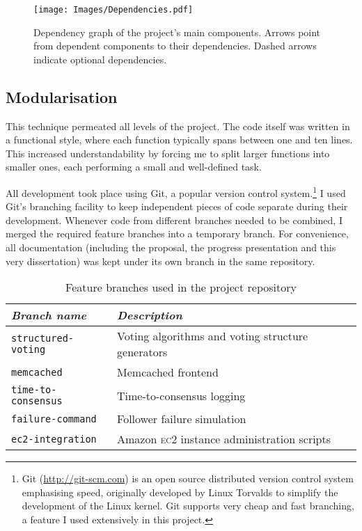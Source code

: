 \documentclass[12pt,chapterprefix=true,toc=bibliography,numbers=noendperiod,
               footnotes=multiple,twoside]{scrreprt}
\newcommand{\ECC}[0]{\textsc{ec}2 }
\begin{document}
\begin{figure}[h]
    \centering
    \texttt{[image: Images/Dependencies.pdf]}
    \caption{Dependency graph of the project's main components. Arrows point from dependent components to their dependencies. Dashed arrows indicate optional dependencies.}
    \label{fig:dependencies}
\end{figure}

\subsection{Modularisation}

This technique permeated all levels of the project. The code itself was written in a functional style, where each function typically spans between one and ten lines. This increased understandability by forcing me to split larger functions into smaller ones, each performing a small and well-defined task.

All development took place using Git, a popular version control system.\footnote{Git (\url{http://git-scm.com}) is an open source distributed version control system emphasising speed, originally developed by Linux Torvalds to simplify the development of the Linux kernel. Git supports very cheap and fast branching, a feature I used extensively in this project.} I used Git's branching facility to keep independent pieces of code separate during their development. Whenever code from different branches needed to be combined, I merged the required feature branches into a temporary branch. For convenience, all documentation (including the proposal, the progress presentation and this very dissertation) was kept under its own branch in the same repository.

\begin{table}[h]
    \centering
    \begin{tabularx}{\textwidth}{l X}
        \toprule
        \textit{Branch name} & \textit{Description} \\
        \midrule
        \texttt{structured-voting} & Voting algorithms and voting structure generators \\
        \texttt{memcached} & Memcached frontend \\
        \texttt{time-to-consensus} & Time-to-consensus logging \\
        \texttt{failure-command} & Follower failure simulation \\
        \texttt{ec2-integration} & Amazon \ECC instance administration scripts \\
        \bottomrule
    \end{tabularx}
    \caption{Feature branches used in the project repository}
    \label{tab:branches}
\end{table}
\end{document}
